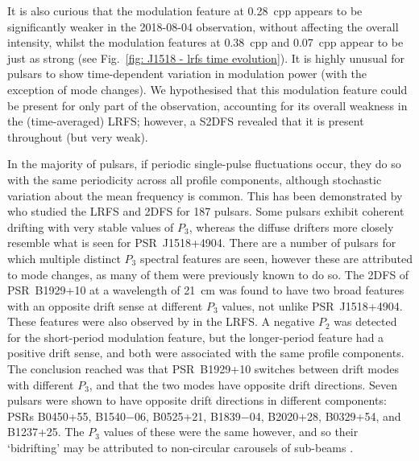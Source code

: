 It is also curious that the modulation feature at 0.28~cpp appears to be significantly weaker in the 2018-08-04 observation, without affecting the overall intensity, whilst the modulation features at 0.38~cpp and 0.07~cpp appear to be just as strong (see Fig.~\ref{fig: J1518 - lrfs time evolution}). It is highly unusual for pulsars to show time-dependent variation in modulation power (with the exception of mode changes). We hypothesised that this modulation feature could be present for only part of the observation, accounting for its overall weakness in the (time-averaged) LRFS; however, a S2DFS revealed that it is present throughout (but very weak). %

In the majority of pulsars, if periodic single-pulse fluctuations occur, they do so with the same periodicity across all profile components, although stochastic variation about the mean frequency is common. This has been demonstrated by \citet{Wxxx2007} who studied the LRFS and 2DFS for 187 pulsars. Some pulsars exhibit coherent drifting with very stable values of $P_3$, whereas the diffuse drifters more closely resemble what is seen for PSR~J1518+4904. There are a number of pulsars for which multiple distinct $P_3$ spectral features are seen, however these are attributed to mode changes, as many of them were previously known to do so. The 2DFS of PSR~B1929+10 at a wavelength of 21~cm was found to have two broad features with an opposite drift sense at different $P_3$ values, not unlike PSR~J1518+4904. These features were also observed by \citet{Bxxx1973} in the LRFS. A negative $P_2$ was detected for the short-period modulation feature, but the longer-period feature had a positive drift sense, and both were associated with the same profile components. The conclusion reached was that PSR~B1929+10 switches between drift modes with different $P_3$, and that the two modes have opposite drift directions. Seven pulsars were shown to have opposite drift directions in different components: PSRs B0450+55, B1540$-$06, B0525+21, B1839$-$04, B2020+28, B0329+54, and B1237+25. The $P_3$ values of these were the same however, and so their `bidrifting' may be attributed to non-circular carousels of sub-beams \citep[e.g.][]{QLZ+2004, Wxxx2016, WWxx2017, SLWM2020}.

